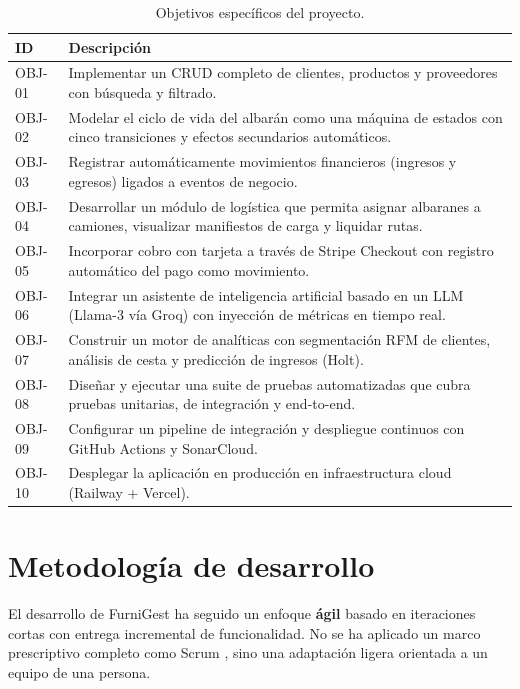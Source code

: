 \documentclass[12pt,twoside,titlepage]{report}
\begin{document}
\begin{table}[H]
  \centering
  \caption{Objetivos específicos del proyecto.}
  \label{tab:objetivos}
  \begin{tabularx}{\textwidth}{lX}
    \toprule
    \textbf{ID} & \textbf{Descripción} \\
    \midrule
    OBJ-01 & Implementar un CRUD completo de clientes, productos y proveedores con búsqueda y filtrado. \\
    OBJ-02 & Modelar el ciclo de vida del albarán como una máquina de estados con cinco transiciones y efectos secundarios automáticos. \\
    OBJ-03 & Registrar automáticamente movimientos financieros (ingresos y egresos) ligados a eventos de negocio. \\
    OBJ-04 & Desarrollar un módulo de logística que permita asignar albaranes a camiones, visualizar manifiestos de carga y liquidar rutas. \\
    OBJ-05 & Incorporar cobro con tarjeta a través de Stripe Checkout con registro automático del pago como movimiento. \\
    OBJ-06 & Integrar un asistente de inteligencia artificial basado en un LLM (Llama-3 vía Groq) con inyección de métricas en tiempo real. \\
    OBJ-07 & Construir un motor de analíticas con segmentación RFM de clientes, análisis de cesta y predicción de ingresos (Holt). \\
    OBJ-08 & Diseñar y ejecutar una suite de pruebas automatizadas que cubra pruebas unitarias, de integración y end-to-end. \\
    OBJ-09 & Configurar un pipeline de integración y despliegue continuos con GitHub Actions y SonarCloud. \\
    OBJ-10 & Desplegar la aplicación en producción en infraestructura cloud (Railway + Vercel). \\
    \bottomrule
  \end{tabularx}
\end{table}

\section{Metodología de desarrollo}

El desarrollo de FurniGest ha seguido un enfoque \textbf{ágil} \cite{manifiestoAgil} basado en iteraciones cortas con entrega incremental de funcionalidad. No se ha aplicado un marco prescriptivo completo como Scrum \cite{schwaber}, sino una adaptación ligera orientada a un equipo de una persona.
\end{document}
